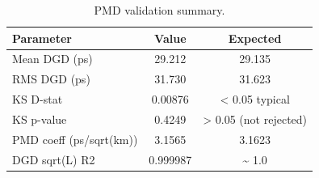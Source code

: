 \begin{table}[!ht]
  \caption{PMD validation summary.}
  \label{tab:pmd}
  \centering
  \begin{tabular}{l c c}
    \toprule
    Parameter & Value & Expected \\
    \midrule
    Mean DGD (ps) & 29.212 & 29.135 \\
    RMS DGD (ps) & 31.730 & 31.623 \\
    KS D-stat & 0.00876 & < 0.05 typical \\
    KS p-value & 0.4249 & > 0.05 (not rejected) \\
    PMD coeff (ps/sqrt(km)) & 3.1565 & 3.1623 \\
    DGD sqrt(L) R2 & 0.999987 & \textasciitilde{} 1.0 \\
    \bottomrule
  \end{tabular}
\end{table}
